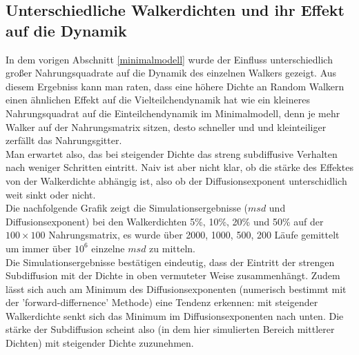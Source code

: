 \documentclass[a4paper, 12pt]{scrartcl}
\begin{document}
\subsection{Unterschiedliche Walkerdichten und ihr Effekt auf die Dynamik}
In dem vorigen Abschnitt \ref{minimalmodell} wurde der Einfluss unterschiedlich großer Nahrungsquadrate auf die Dynamik des einzelnen Walkers gezeigt. Aus diesem Ergebniss kann man raten, dass eine höhere Dichte an Random Walkern einen ähnlichen Effekt auf die Vielteilchendynamik hat wie ein kleineres Nahrungsquadrat auf die Einteilchendynamik im Minimalmodell, denn je mehr Walker auf der Nahrungsmatrix sitzen, desto schneller und und kleinteiliger zerfällt das Nahrungsgitter. 
\\
Man erwartet also, das bei steigender Dichte das streng subdiffusive Verhalten nach weniger Schritten eintritt. Naiv ist aber nicht klar, ob die stärke des Effektes von der Walkerdichte abhängig ist, also ob der Diffusionsexponent unterschidlich weit sinkt oder nicht.
\\
\noindent
Die nachfolgende Grafik zeigt die Simulationsergebnisse ($msd$ und Diffusionsexponent) bei den Walkerdichten 5\%, 10\%, 20\% und 50\% auf der $100 \times 100$ Nahrungsmatrix, es wurde über 2000, 1000, 500, 200 Läufe gemittelt um immer über $10^6$ einzelne $msd$ zu mitteln.
\\
\noindent Die Simulationsergebnisse bestätigen eindeutig, dass der Eintritt der strengen Subdiffusion mit der Dichte in oben vermuteter Weise zusammenhängt. Zudem lässt sich auch am Minimum des Diffusionsexponenten (numerisch bestimmt mit der 'forward-differnence' Methode) eine Tendenz erkennen: mit steigender Walkerdichte senkt sich das Minimum im Diffusionsexponenten nach unten. Die stärke der Subdiffusion scheint also (in dem hier simulierten Bereich mittlerer Dichten) mit steigender Dichte zuzunehmen.
\end{document}
